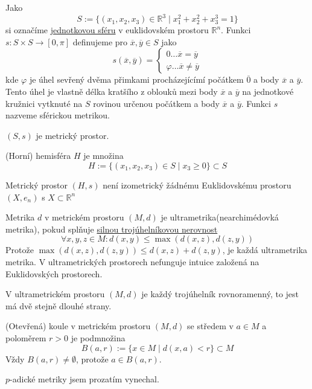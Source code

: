 \documentclass[../main.tex]{subfiles}
\begin{document}
\begin{example}
    Jako \[S := \{ (x_1,x_2,x_3) \in \mathbb{R}^3 \mid x_1^2 + x_2^2 + x_3^3 = 1 \}\] si označíme \underline{jednotkovou sféru} v
    euklidovském prostoru $\mathbb{R}^n$. Funkci $s: S\times S \to [0,\pi]$ definujeme pro $\overline{x}, \overline{y} \in S$
    jako \[ s(\overline{x}, \overline{y}) = \begin{cases}
        0 \dots \overline{x} = \overline{y}\\
        \varphi \dots \overline{x} \neq \overline{y}
    \end{cases} \]
    kde $\varphi$ je úhel sevřený dvěma přimkami procházejícímí počátkem $\overline{0}$ a body $\overline{x}$ a $\overline{y}$.
    Tento úhel je vlastně délka kratšího z oblouků mezi body $\overline{x}$ a $\overline{y}$ na jednotkové kružnici vytknuté na $S$ rovinou určenou
    počátkem a body $\overline{x}$ a $\overline{y}$. Funkci $s$ nazveme sférickou metrikou.
\end{example}

\begin{lemma}
    $(S,s)$ je metrický prostor.
\end{lemma}

\begin{definition}
    (Horní) hemisféra $H$ je množina \[ H := \{ (x_1,x_2,x_3) \in S \mid x_3 \geq 0 \} \subset S \]
\end{definition}

\begin{theorem}
    Metrický prostor $(H,s)$ není izometrický žádnému Euklidovskému prostoru $(X,e_n)$ s $X \subset \mathbb{R}^n$    
\end{theorem}

\begin{definition}[Ultrametrika]
    Metrika $d$ v metrickém prostoru $(M,d)$ je ultrametrika(nearchimédovká metrika),
    pokud splňuje \underline{silnou trojúhelníkovou nerovnost}
    \[ \forall x,y,z \in M: d(x,y) \leq \max(d(x,z), d(z,y)) \]
    Protože $\max(d(x,z), d(z,y)) \leq d(x,z) + d(z,y)$, je každá ultrametrika metrika.
    V ultrametrických prostorech nefunguje intuice založená na Euklidovských prostorech.
\end{definition}

\begin{lemma}
    V ultrametrickém prostoru $(M,d)$ je každý trojúhelník rovnoramenný, to jest má dvě stejně dlouhé strany.
\end{lemma}

\begin{definition}
    (Otevřená) koule v metrickém prostoru $(M,d)$ se středem v $a \in M$ a poloměrem $r > 0$ je podmnožina
    \[ B(a,r) := \{ x \in M \mid d(x,a) < r \} \subset M \]
    Vždy $B(a,r) \neq \emptyset$, protože $a \in B(a,r)$.
\end{definition}

\noindent
$p$-adické metriky jsem prozatím vynechal.

\end{document}
